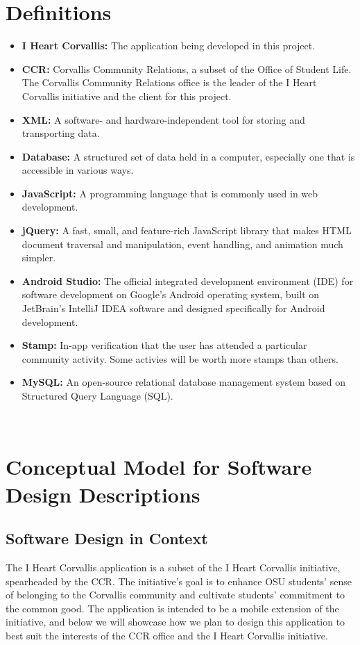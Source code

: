 \documentclass[draftclsnofoot, onecolumn, 10pt, compsoc]{IEEEtran}
\begin{document}
	\section{Definitions}
		\begin{itemize}
			\item \textbf{I Heart Corvallis:} The application being developed in this project.
			\item \textbf{CCR:} Corvallis Community Relations, a subset of the Office of Student Life. The Corvallis Community Relations office is the leader of the I Heart Corvallis initiative and the client for this project.
			\item \textbf{XML:} A software- and hardware-independent tool for storing and transporting data.
			\item \textbf{Database:} A structured set of data held in a computer, especially one that is accessible in various ways.
			\item \textbf{JavaScript:} A programming language that is commonly used in web development.
			\item \textbf{jQuery:} A fast, small, and feature-rich JavaScript library that makes HTML document traversal and manipulation, event handling, and animation much simpler.
			\item \textbf{Android Studio:} The official integrated development environment (IDE) for software development on Google's Android operating system, built on JetBrain's IntelliJ IDEA software and designed specifically for Android development.
			\item \textbf{Stamp:} In-app verification that the user has attended a particular community activity. Some activies will be worth more stamps than others.
			\item \textbf{MySQL:} An open-source relational database management system based on Structured Query Language (SQL).
		\end{itemize}
			~\cite{jQuery}
		
	\section{Conceptual Model for Software Design Descriptions}
		\subsection{Software Design in Context}
			The I Heart Corvallis application is a subset of the I Heart Corvallis initiative, spearheaded by the CCR. The initiative's goal is to enhance OSU students' sense of belonging to the Corvallis community and cultivate students' commitment to the common good. The application is intended to be a mobile extension of the initiative, and below we will showcase how we plan to design this application to best suit the interests of the CCR office and the I Heart Corvallis initiative.
\end{document}
